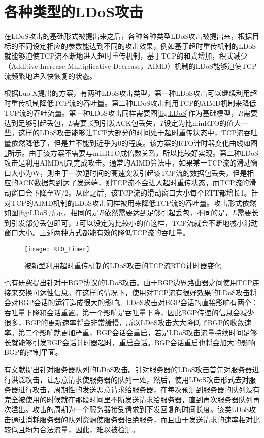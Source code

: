 \section{各种类型的LDoS攻击}
\label{chap3:LDoStypes}
在LDoS攻击的基础形式被提出来之后，各种各种类型LDoS攻击被提出来，根据目标的不同设定相应的参数能达到不同的攻击效果，例如基于超时重传机制的LDoS就能够迫使TCP流不断地进入超时重传机制，基于TCP的和式增加，积式减少（Additive Increase Multiplicative Decrease，AIMD）机制的LDoS能够迫使TCP流频繁地进入快恢复的状态。

根据Luo.X\cite{Luo2005OnAN}提出的方案，有两种LDoS攻击类型，第一种LDoS攻击可以继续利用超时重传机制降低TCP流的吞吐量。第二种LDoS攻击利用TCP的AIMD机制来降低TCP流的吞吐流量。第一种LDoS攻击同样需要图\ref{fig:LDoS}作为基础模型，$R$需要达到足够引起丢包，$L$需要长到引发ACK包丢失，$T$设定为比minRTO的值大一些。这样的LDoS攻击能够让TCP大部分的时间处于超时重传状态中，TCP流吞吐量依然降低了，但是并不能到近乎为0的程度。该方案的RTO计时器变化曲线如图\ref{fig:rto-timer-1}所示。由于该方案不需要与minRTO成倍数关系，所以比较好实现。第二种LDoS攻击是利用AIMD机制完成攻击。通常的AIMD算法中，如果某一TCP流的滑动窗口大小为W，则由于一次短时间的高速突发引起该TCP流的数据包丢失，但是相应的ACK数据包到达了发送端，则TCP流不会进入超时重传状态，而TCP流的滑动窗口会下降至W/2。从此之后，该TCP流的滑动窗口大小每个RTT都增长1。针对TCP的AIMD机制的LDoS攻击同样被用来降低TCP流的吞吐量。攻击形式依然如图\ref{fig:LDoS}所示，相同的是$R$依然需要达到足够引起丢包，不同的是，$L$需要长到引发部分丢包即可，$T$可以设定为比较小的值这样，TCP流就会不断地减小滑动窗口大小。上述两种方式都能有效的降低TCP流的吞吐量。

\begin{figure}
    \centering
    \texttt{[image: RTO\_timer]}
    \caption{被新型利用超时重传机制的LDoS攻击的TCP流RTO计时器变化}
    \label{fig:rto-timer-1}
\end{figure}

也有研究\cite{b2}提出针对于BGP协议的LDoS攻击。由于BGP边界路由器之间使用TCP连接来交换可达性信息。在这样的情况下，使用对TCP流有很好效果的LDoS攻击将会对BGP会话的运行造成很大的影响。LDoS攻击对BGP会话的直接影响有两个：吞吐量下降和会话重置。第一个影响是吞吐量下降，因此BGP传递的信息会减少很多，BGP的更新速率将会非常缓慢，所以LDoS攻击大大降低了BGP的收敛速率。第二个影响就更加严重，BGP会话会重启，若是LDoS攻击流量持续时间足够长就能够引发BGP会话计时器超时，重启会话。BGP会话重启也将会加大的影响BGP的控制平面。

有文献\cite{Maci2007Evaluation}提出针对服务器队列的LDoS攻击。针对服务器的LDoS攻击首先对服务器进行洪泛攻击，让恶意请求使服务器的队列一处，然后，使用LDoS攻击形式去对服务器进行攻击，周期性的发送恶意请求给服务器，在每次预测到服务器的队列没有完全被使用的时候就在那段时间里不断发送请求给服务器，直到再次服务器队列再次溢出。攻击的周期为一个服务器接受请求到下发回复的时间长度。该类LDoS攻击通过消耗服务器的队列资源使服务器拒绝服务，而且由于发送请求的速率相对比较低且均为合法流量，因此，难以被检测。

